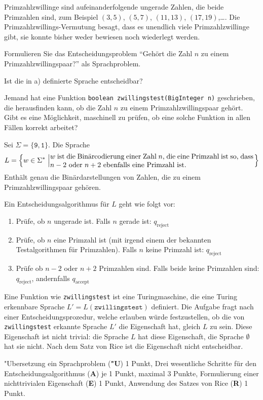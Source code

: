 Primzahlzwillinge sind aufeinanderfolgende ungerade Zahlen, die beide
Primzahlen sind, zum Beispiel $(3,5)$, $(5,7)$, $(11,13)$, $(17,19)$,\dots.
Die Primzahlzwillings-Vermutung besagt, dass es unendlich viele
Primzahlzwillinge gibt, sie konnte bisher weder bewiesen noch wiederlegt
werden.

\begin{teilaufgaben}
\item Formulieren Sie das Entscheidungsproblem ``Gehört die Zahl $n$ zu
einem Primzahlzwillingspaar?'' als Sprachproblem.
\item Ist die in a) definierte Sprache entscheidbar?
\item Jemand hat eine Funktion \texttt{boolean zwillingstest(BigInteger n)}
geschrieben, die herausfinden kann, ob die Zahl $n$ zu einem
Primzahlzwillingspaar gehört.
Gibt es eine Möglichkeit, maschinell zu prüfen, ob eine solche Funktion
in allen Fällen korrekt arbeitet?
\end{teilaufgaben}

\begin{loesung}
\begin{teilaufgaben}
\item Sei $\Sigma=\{\texttt{9},\texttt{1}\}$. Die Sprache
\[
L=\left\{w\in\Sigma^*\,\left|
\begin{minipage}{4truein}
$w$ ist die Binärcodierung einer Zahl $n$, die eine Primzahl ist
so, dass $n-2$ oder $n+2$ ebenfalls eine Primzahl ist.
\end{minipage}
\right.
\right\}
\]
Enthält genau die Binärdarstellungen von Zahlen, die zu einem
Primzahlzwillingspaar gehören.
\item
Ein Entscheidungsalgorithmus für $L$ geht wie folgt vor:
\begin{enumerate}
\item Prüfe, ob $n$ ungerade ist. Falls $n$ gerade ist: $q_\text{reject}$
\item Prüfe, ob $n$ eine Primzahl ist (mit irgend einem der bekannten
Testalgorithmen für Primzahlen). Falls $n$ keine Primzahl ist:
$q_{\text{reject}}$
\item Prüfe ob $n-2$ oder $n+2$ Primzahlen sind. Falls beide keine
Primzahlen sind: $q_{\text{reject}}$, andernfalls $q_{\text{accept}}$
\end{enumerate}
\item
Eine Funktion wie \texttt{zwillingstest} ist eine Turingmaschine, die
eine Turing erkennbare Sprache $L'=L(\texttt{zwillingstest})$ definiert.
Die Aufgabe fragt nach einer Entscheidungsprozedur, welche erlauben
würde festzustellen, ob die von \texttt{zwillingstest} erkannte
Sprache $L'$ die Eigenschaft hat, gleich $L$ zu sein. Diese
Eigenschaft ist nicht trivial: die Sprache $L$ hat diese Eigenschaft,
die Sprache $\emptyset$ hat sie nicht. Nach dem Satz von Rice ist
die Eigenschaft nicht entscheidbar.
\qedhere
\end{teilaufgaben}
\end{loesung}

\begin{bewertung}
"Ubersetzung ein Sprachproblem ({\bf "U}) 1 Punkt,
Drei wesentliche Schritte für den Entscheidungsalgorithmus ({\bf A})
je 1 Punkt, maximal 3 Punkte,
Formulierung einer nichttrivialen Eigenschaft ({\bf E}) 1 Punkt,
Anwendung des Satzes von Rice ({\bf R}) 1 Punkt.
\end{bewertung}

